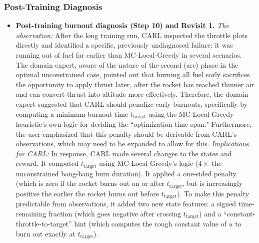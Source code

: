 \documentclass[mnsc,sglanonrev]{informs4}
\begin{document}
\subsubsection{Post-Training Diagnosis} \label{sec:godd_post_train}

\begin{itemize}
\item \textbf{Post-training burnout diagnosis (Step 10) and Revisit 1.} 
\emph{The observation: }After the long training run, CARL inspected the throttle plots directly and identified a specific, previously undiagnosed failure: it was running out of fuel far earlier than MC-Local-Greedy in several scenarios. The domain expert, aware of the nature of the second (arc) phase in the optimal unconstrained case, pointed out that burning all fuel early sacrifices the opportunity to apply thrust later, after the rocket has reached thinner air and can convert thrust into altitude more effectively. Therefore, the domain expert suggested that CARL should penalize early burnouts, specifically by computing a minimum burnout time $t_{\mathrm{target}}$ using the MC-Local-Greedy heuristic's own logic for deciding the ``optimization time span." Furthermore, the user emphasized that this penalty should be derivable from CARL's observations, which may need to be expanded to allow for this. \emph{Implications for CARL: }In response, CARL made several changes to the states and reward. It computed $t_{\mathrm{target}}$ using MC-Local-Greedy's logic ($4\times$ the unconstrained bang-bang burn duration). It applied a one-sided penalty (which is zero if the rocket burns out on or after $t_{\mathrm{target}}$, but is increasingly positive the earlier the rocket burns out before $t_{\mathrm{target}}$). To make this penalty predictable from observations, it added two new state features: a signed time-remaining fraction (which goes negative after crossing $t_{\mathrm{target}}$) and a ``constant-throttle-to-target'' hint (which computes the rough constant value of $u$ to burn out exactly at $t_{\mathrm{target}}$).


\end{itemize}
\end{document}
